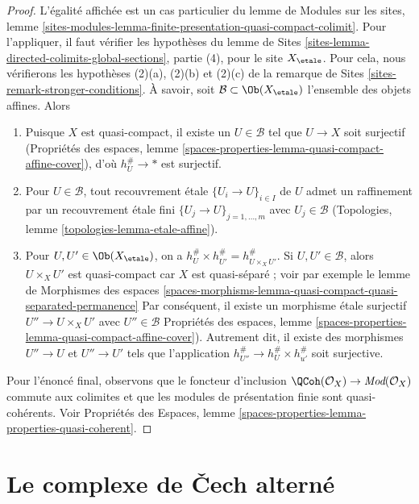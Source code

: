 \begin{proof}
L'égalité affichée est un cas particulier du lemme de
Modules sur les sites, lemme \ref{sites-modules-lemma-finite-presentation-quasi-compact-colimit}.
Pour l'appliquer, il faut vérifier les hypothèses du
lemme de Sites \ref{sites-lemma-directed-colimits-global-sections}, partie (4),
pour le site $X_\etale$.
Pour cela, nous vérifierons les hypothèses
(2)(a), (2)(b) et (2)(c) de
la remarque de Sites \ref{sites-remark-stronger-conditions}.
À savoir, soit $\mathcal{B} \subset \Ob(X_\etale)$ l'ensemble des objets affines.
Alors
\begin{enumerate}
\item Puisque $X$ est quasi-compact, il existe un $U \in \mathcal{B}$
tel que $U \to X$ soit surjectif
(Propriétés des espaces, lemme
\ref{spaces-properties-lemma-quasi-compact-affine-cover}),
d'où $h_U^\# \to *$ est surjectif.
\item Pour $U \in \mathcal{B}$, tout recouvrement étale $\{U_i \to U\}_{i \in I}$
de $U$ admet un raffinement par un recouvrement étale fini
$\{U_j \to U\}_{j = 1, \ldots, m}$ avec $U_j \in \mathcal{B}$
(Topologies, lemme \ref{topologies-lemma-etale-affine}).
\item Pour $U, U' \in \Ob(X_\etale)$, on a
$h_U^\# \times h_{U'}^\# = h_{U \times_X U'}^\#$.
Si $U, U' \in \mathcal{B}$, alors $U \times_X U'$ est quasi-compact
car $X$ est quasi-séparé ; voir par exemple le lemme de Morphismes des espaces
\ref{spaces-morphisms-lemma-quasi-compact-quasi-separated-permanence}
Par conséquent, il existe un morphisme étale surjectif
$U'' \to U \times_X U'$ avec $U'' \in \mathcal{B}$
Propriétés des espaces, lemme
\ref{spaces-properties-lemma-quasi-compact-affine-cover}).
Autrement dit, il existe des morphismes $U'' \to U$ et $U'' \to U'$
tels que l'application $h_{U''}^\# \to h_U^\# \times h_{u'}^\#$ soit
surjective.
\end{enumerate}
Pour l'énoncé final, observons que le foncteur d'inclusion
$\QCoh(\mathcal{O}_X) \to \textit{Mod}(\mathcal{O}_X)$
commute aux colimites et que les modules de présentation finie
sont quasi-cohérents. Voir
Propriétés des Espaces, lemme
\ref{spaces-properties-lemma-properties-quasi-coherent}.
\end{proof}





\section{Le complexe de {\v C}ech alterné}
\label{section-alternating-cech}

